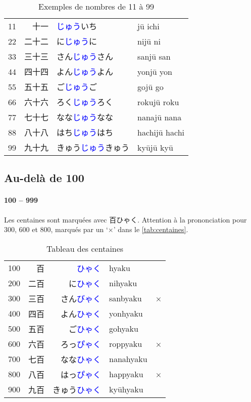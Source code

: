 \documentclass[a4paper,10pt,french,openany]{memoir}
\newcommand{\term}[1]{\textcolor{blue}{#1}}
\begin{document}
\begin{table}[htbp]
 \centering
 \caption{Exemples de nombres de 11 à 99}
 \label{tab:dizaines}
 \begin{tabular}{crll}
  11 &  十一 & \term{じゅう}いち      &jū ichi\\
  22 & 二十二 & に\term{じゅう}に      &nijū ni\\
  33 & 三十三 & さん\term{じゅう}さん   &sanjū san\\
  44 & 四十四 & よん\term{じゅう}よん   &yonjū yon\\
  55 & 五十五 & ご\term{じゅう}ご      &gojū go\\
  66 & 六十六 & ろく\term{じゅう}ろく   &rokujū roku\\
  77 & 七十七 & なな\term{じゅう}なな   &nanajū nana\\
  88 & 八十八 & はち\term{じゅう}はち   &hachijū hachi\\
  99 & 九十九 & きゅう\term{じゅう}きゅう&kyūjū kyū\\
 \end{tabular}
\end{table}

\subsection{Au-delà de 100}

\paragraph{100 -- 999}
Les centaines sont marquées avec \ruby 百{ひゃく}. Attention à la prononciation pour 300, 600 et 800, marqués par un `×' dans le \autoref{tab:centaines}.

\begin{table}[p]
 \centering
 \caption{Tableau des centaines}
 \label{tab:centaines}
 \begin{tabular}{crrll}
  100 & 百 & \term{ひゃく}      &hyaku\\
  200 & 二百 & に\term{ひゃく}    &nihyaku\\
  300 & 三百 & さん\term{びゃく}   &sanbyaku&×\\
  400 & 四百 & よん\term{ひゃく}   &yonhyaku\\
  500 & 五百 & ご\term{ひゃく}    &gohyaku\\
  600 & 六百 & ろっ\term{ぴゃく}   &roppyaku&×\\
  700 & 七百 & なな\term{ひゃく}   &nanahyaku\\
  800 & 八百 & はっ\term{ぴゃく}   &happyaku&×\\
  900 & 九百 & きゅう\term{ひゃく} &kyūhyaku\\
 \end{tabular}
\end{table}
\end{document}
